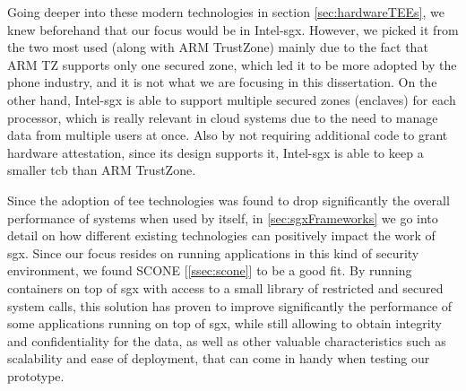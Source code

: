 Going deeper into these modern technologies in section \ref{sec:hardwareTEEs}, we knew beforehand that our focus would be in Intel-\gls{sgx}. However, we picked it from the two most used (along with ARM TrustZone) mainly due to the fact that ARM TZ supports only one secured zone, which led it to be more adopted by the phone industry, and it is not what we are focusing in this dissertation. On the other hand, Intel-\gls{sgx} is able to support multiple secured zones (enclaves) for each processor, which is really relevant in cloud systems due to the need to manage data from multiple users at once.
Also by not requiring additional code to grant hardware attestation, since its design supports it, Intel-\gls{sgx} is able to keep a smaller \gls{tcb} than ARM TrustZone.

Since the adoption of \gls{tee} technologies was found to drop significantly the overall performance of systems when used by itself, in \ref{sec:sgxFrameworks} we go into detail on how different existing technologies can positively impact the work of \gls{sgx}. Since our focus resides on running applications in this kind of security environment, we found SCONE [\ref{ssec:scone}] to be a good fit. By running containers on top of \gls{sgx} with access to a small library of restricted and secured system calls, this solution has proven to improve significantly the performance of some applications running on top of \gls{sgx}, while still allowing to obtain integrity and confidentiality for the data, as well as other valuable characteristics such as scalability and ease of deployment, that can come in handy when testing our prototype. 










